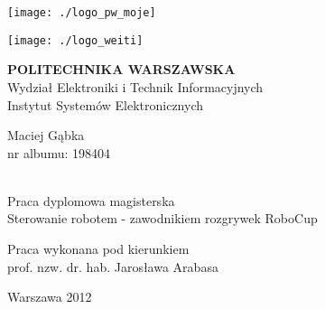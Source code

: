 \begin{titlepage}
\linespread{1.1}
\hspace{0.4cm}
 \begin{minipage}{0.4\textwidth}
	\begin{flushleft} 
	\texttt{[image: ./logo\_pw\_moje]}
	\end{flushleft}
\end{minipage}
\begin{minipage}{0.4\textwidth}
	\begin{flushright} 
	\texttt{[image: ./logo\_weiti]}
	\end{flushright}
\end{minipage}
\begin{flushleft}


\end{flushleft}
\vspace{0.1cm}
\begin{center}
{\textbf{\LARGE POLITECHNIKA WARSZAWSKA}}\\
\Large Wydział Elektroniki i Technik Informacyjnych\\
\Large Instytut Systemów Elektronicznych\\[2.5cm]
 \begin{minipage}{0.9\textwidth}
	\begin{center} 
	\Large
	Maciej Gąbka\\nr albumu: 198404
	\end{center}
\end{minipage}
\\[1.5cm]
{\Large Praca dyplomowa magisterska}\\
 \Huge Sterowanie robotem - zawodnikiem rozgrywek RoboCup\\[2.0cm]
\begin{flushleft} \large
\hspace{5.5cm}Praca wykonana pod kierunkiem \\ 
\hspace{5.5cm}prof. nzw. dr. hab. Jarosława Arabasa
\end{flushleft}
\vfill
{\large Warszawa 2012}
\end{center}
\end{titlepage}
